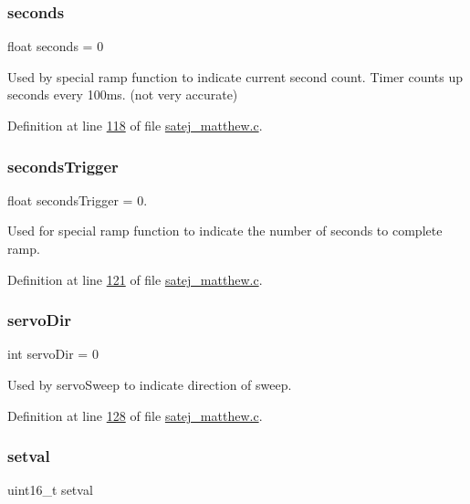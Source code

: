 \subsubsection{\texorpdfstring{seconds}{seconds}}
{\footnotesize\ttfamily float seconds = 0}

Used by special ramp function to indicate current second count. Timer counts up seconds every 100ms. (not very accurate) 

Definition at line \mbox{\hyperlink{satej__matthew_8c_source_l00118}{118}} of file \mbox{\hyperlink{satej__matthew_8c_source}{satej\+\_\+matthew.\+c}}.

\mbox{\label{satej__matthew_8c_ab7e143110d340e731fa81edab74b60dd}} 
\subsubsection{\texorpdfstring{secondsTrigger}{secondsTrigger}}
{\footnotesize\ttfamily float seconds\+Trigger = 0.}

Used for special ramp function to indicate the number of seconds to complete ramp. 

Definition at line \mbox{\hyperlink{satej__matthew_8c_source_l00121}{121}} of file \mbox{\hyperlink{satej__matthew_8c_source}{satej\+\_\+matthew.\+c}}.

\mbox{\label{satej__matthew_8c_a4569da2d36a3fe621d19ed0ffad1a67b}} 
\subsubsection{\texorpdfstring{servoDir}{servoDir}}
{\footnotesize\ttfamily int servo\+Dir = 0}

Used by servo\+Sweep to indicate direction of sweep. 

Definition at line \mbox{\hyperlink{satej__matthew_8c_source_l00128}{128}} of file \mbox{\hyperlink{satej__matthew_8c_source}{satej\+\_\+matthew.\+c}}.

\mbox{\label{satej__matthew_8c_a3be316f37343a45da2f52754d352df9b}} 
\subsubsection{\texorpdfstring{setval}{setval}}
{\footnotesize\ttfamily uint16\+\_\+t setval}

